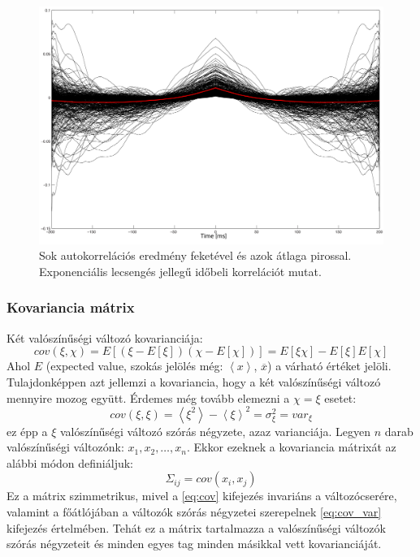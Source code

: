 \begin{figure}[h!]
	\centering
	\includegraphics[width=0.8\linewidth]{fig/noise/autocorr.png}
	\caption[Zaj autokorrelációja]{Sok autokorrelációs eredmény feketével és azok átlaga pirossal. Exponenciális lecsengés jellegű időbeli korrelációt mutat.}
	\label{fig:autocorrelation}
\end{figure}



\subsubsection{Kovariancia mátrix}
Két valószínűségi változó kovarianciája:
\begin{equation}\label{eq:cov}
cov(\xi,\chi) = E\left[\left(\xi-E\left[\xi\right]\right)\left(\chi-E\left[\chi\right]\right)\right] = E\left[\xi\chi\right] - E\left[\xi\right]E\left[\chi\right]
\end{equation}
Ahol $E$ (expected value, szokás jelölés még: $\left<x\right>$, $\overline{x}$) a várható értéket jelöli. Tulajdonképpen azt jellemzi a kovariancia, hogy a két valószínűségi változó mennyire mozog együtt. Érdemes még tovább elemezni a $\chi=\xi$ esetet:
\begin{equation}\label{eq:cov_var}
cov(\xi,\xi) = \left<\xi^2\right> - \left<\xi\right>^2 = \sigma_\xi^2 = var_\xi
\end{equation}
ez épp a $\xi$ valószínűségi változó szórás négyzete, azaz varianciája. 
Legyen $n$ darab valószínűségi változónk: $x_1, x_2, \ldots , x_n$. Ekkor ezeknek a kovariancia mátrixát az alábbi módon definiáljuk:
\begin{equation}\label{eq:covmat}
\Sigma_{ij} = cov(x_i, x_j)
\end{equation}
Ez a mátrix szimmetrikus, mivel a \ref{eq:cov} kifejezés invariáns a változócserére, valamint a főátlójában a változók szórás négyzetei szerepelnek \ref{eq:cov_var} kifejezés értelmében. Tehát ez a mátrix tartalmazza a valószínűségi változók szórás négyzeteit és minden egyes tag minden másikkal vett kovarianciáját.

